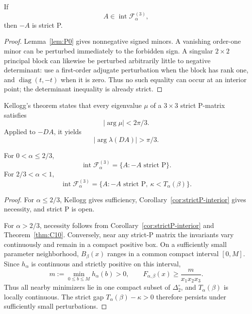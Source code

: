 \begin{corollary}
\label{cor:strictP-interior}
If
\[
A\in\operatorname{int}\mathcal F_\alpha^{(3)},
\]
then \(-A\) is strict P.
\end{corollary}

\begin{proof}
Lemma~\ref{lem:P0} gives nonnegative signed minors. A vanishing order-one minor can be perturbed immediately to the forbidden sign. A singular \(2\times2\) principal block can likewise be perturbed arbitrarily little to negative determinant: use a first-order adjugate perturbation when the block has rank one, and \(\operatorname{diag}(t,-t)\) when it is zero. Thus no such equality can occur at an interior point; the determinant inequality is already strict.
\end{proof}

Kellogg's theorem \citep{Kellogg1972} states that every eigenvalue \(\mu\) of a \(3\times3\) strict P-matrix satisfies
\[
|\arg\mu|<2\pi/3.
\]
Applied to \(-DA\), it yields
\[
|\arg\lambda(DA)|>\pi/3.
\]

\begin{theorem}
\label{thm:interior-F}
For \(0<\alpha\le2/3\),
\[
\operatorname{int}\mathcal F_\alpha^{(3)}
=
\{A:-A\text{ strict P}\}.
\]
For \(2/3<\alpha<1\),
\[
\operatorname{int}\mathcal F_\alpha^{(3)}
=
\{A:-A\text{ strict P},\ \kappa<T_\alpha(\beta)\}.
\]
\end{theorem}

\begin{proof}
For \(\alpha\le2/3\), Kellogg gives sufficiency, Corollary~\ref{cor:strictP-interior} gives necessity, and strict P is open.

For \(\alpha>2/3\), necessity follows from Corollary~\ref{cor:strictP-interior} and Theorem~\ref{thm:C10}. Conversely, near any strict-P matrix the invariants vary continuously and remain in a compact positive box. On a sufficiently small parameter neighborhood, \(B_\beta(x)\) ranges in a common compact interval \([0,M]\). Since \(h_\alpha\) is continuous and strictly positive on this interval,
\[
m:=\min_{0\le b\le M}h_\alpha(b)>0,
\qquad
F_{\alpha,\beta}(x)\ge\frac{m}{x_1x_2x_3}.
\]
Thus all nearby minimizers lie in one compact subset of \(\Delta_2^\circ\), and \(T_\alpha(\beta)\) is locally continuous. The strict gap \(T_\alpha(\beta)-\kappa>0\) therefore persists under sufficiently small perturbations.
\end{proof}

